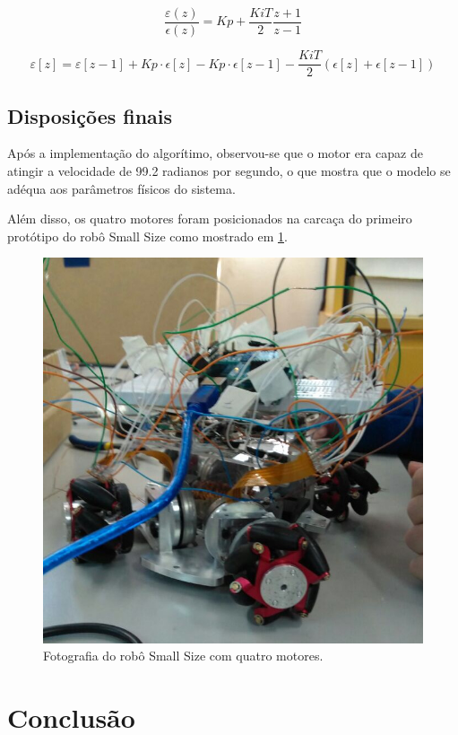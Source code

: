 \documentclass[a4paper,11pt]{article}
\begin{document}
		\begin{equation}
			\frac{\varepsilon(z)}{\epsilon(z)}= Kp + \frac{Ki T}{2}\frac{z+1}{z-1} \label{tfdiscreta}
		\end{equation}
			
		\begin{equation}
			\varepsilon[z] = \varepsilon[z-1] + Kp\cdot\epsilon[z] - Kp\cdot\epsilon[z-1] - \frac{Ki T}{2}(\epsilon[z] + \epsilon[z-1]) \label{recorrencia}
		\end{equation}
		
		\subsection{Disposições finais}
		
		Após a implementação do algorítimo, observou-se que o motor era capaz de atingir a velocidade de 99.2 radianos por segundo, o que mostra que o modelo se adéqua aos parâmetros físicos do sistema.
		
		Além disso, os quatro motores foram posicionados na carcaça do primeiro protótipo do robô Small Size como mostrado em \ref{fig:smallfoto}.
		
		\begin{figure}[ht]
			\centering
			\includegraphics[width=0.7\linewidth]{images/smallfoto}
			\caption{Fotografia do robô Small Size com quatro motores.}
			\label{fig:smallfoto}
		\end{figure}
		
	\section{Conclusão}
	
\end{document}
